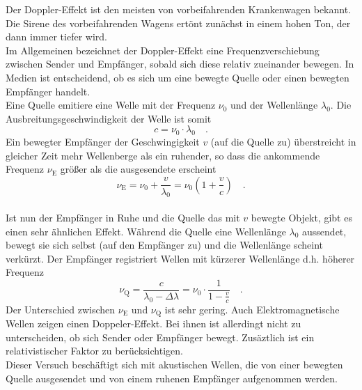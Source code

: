 Der Doppler-Effekt ist den meisten von vorbeifahrenden Krankenwagen bekannt. Die Sirene des vorbeifahrenden Wagens ertönt zunächst in einem hohen Ton, der dann immer tiefer wird. \\
Im Allgemeinen bezeichnet der Doppler-Effekt eine Frequenzverschiebung zwischen Sender und Empfänger, sobald sich diese relativ zueinander bewegen. In Medien ist entscheidend, ob es sich um eine bewegte Quelle oder einen bewegten Empfänger handelt. \\
Eine Quelle emitiere eine Welle mit der Frequenz $\nu_0$ und der Wellenlänge $\lambda_0$. Die Ausbreitungsgeschwindigkeit der Welle ist somit
\begin{equation}
c = \nu_0 \cdot \lambda_0 \quad .
\end{equation}
Ein bewegter Empfänger der Geschwingigkeit $v$ (auf die Quelle zu) überstreicht in gleicher Zeit mehr Wellenberge als ein ruhender, so dass die ankommende Frequenz $\nu_\text{E}$ größer als die ausgesendete erscheint
\begin{equation}
\nu_\text{E} = \nu_0 + \frac{v}{\lambda_0} = \nu_0 \left(1 + \frac{v}{c} \right) \quad .
\end{equation}
\\
Ist nun der Empfänger in Ruhe und die Quelle das mit $v$ bewegte Objekt, gibt es einen sehr ähnlichen Effekt. Während die Quelle eine Wellenlänge $\lambda_0$ aussendet, bewegt sie sich selbst (auf den Empfänger zu) und die Wellenlänge scheint verkürzt. Der Empfänger registriert Wellen mit kürzerer Wellenlänge d.h. höherer Frequenz
\begin{equation}
\nu_\text{Q} = \frac{c}{\lambda_0 - \Delta \lambda} = \nu_0 \cdot \frac{1}{1-\frac{v}{c}} \quad .
\end{equation}
Der Unterschied zwischen $\nu_\text{E}$ und $\nu_\text{Q}$ ist sehr gering. Auch Elektromagnetische Wellen zeigen einen Doppeler-Effekt. Bei ihnen ist allerdingt nicht zu unterscheiden, ob sich Sender oder Empfänger bewegt. Zusäztlich ist ein relativistischer Faktor zu berücksichtigen. \\
Dieser Versuch beschäftigt sich mit akustischen Wellen, die von einer bewegten Quelle ausgesendet und von einem ruhenen Empfänger aufgenommen werden.